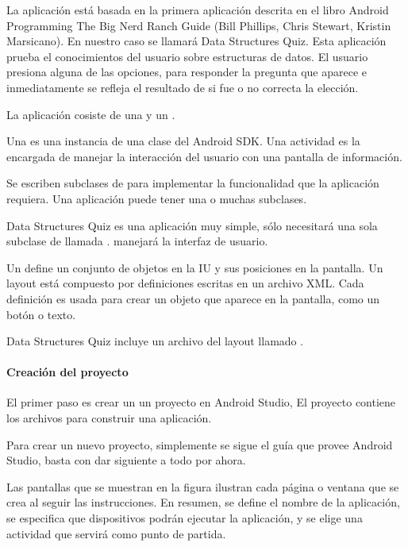 La aplicación está basada en la primera aplicación descrita en el libro Android
Programming The Big Nerd Ranch Guide (Bill Phillips, Chris Stewart, Kristin Marsicano).
En nuestro caso se llamará Data Structures Quiz. Esta aplicación prueba el
conocimientos del usuario sobre estructuras de datos. El usuario presiona
alguna de las opciones, para responder la pregunta que aparece e inmediatamente
se refleja el resultado de si fue o no correcta la elección.

La aplicación cosiste de una  y un .

Una  es una instancia de  una clase del Android SDK.
Una actividad es la encargada de manejar la interacción del usuario con una
pantalla de información.

Se escriben subclases de  para implementar la funcionalidad que la
aplicación requiera. Una aplicación puede tener una o muchas subclases.

Data Structures Quiz es una aplicación muy simple, sólo necesitará una sola
subclase de  llamada .  manejará la
interfaz de usuario.

Un  define un conjunto de objetos en la IU y sus posiciones en la
pantalla. Un layout está compuesto por definiciones escritas en un archivo
XML. Cada definición es usada para crear un objeto que aparece en la pantalla,
como un botón o texto.

Data Structures Quiz incluye un archivo del layout llamado .


\paragraph{Creación del proyecto}
\label{\detokenize{dev_docs:creacion-del-proyecto}}
El primer paso es crear un un proyecto en Android Studio, El proyecto contiene
los archivos para construir una aplicación.

Para crear un nuevo proyecto, simplemente se sigue el guía que provee Android
Studio, basta con dar siguiente a todo por ahora.

Las pantallas que se muestran en la figura ilustran cada página o ventana
que se crea al seguir las instrucciones. En resumen, se define el nombre
de la aplicación, se especifica que dispositivos podrán ejecutar la aplicación,
y se elige una actividad que servirá como punto de partida.


